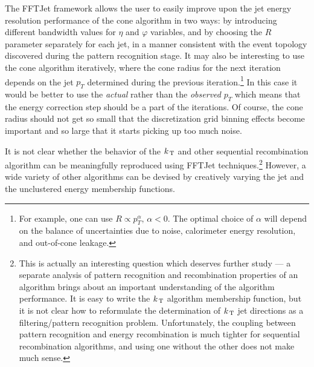 \documentclass[epsf,12pt,titlepage]{article}
\newcommand{\sub}[1]{\ensuremath{_{\mbox{\scriptsize \,#1}}}}
\def\KT {\mbox{$k\sub{T}$} }
\begin{document}
The FFTJet framework allows the user to easily improve
upon the jet energy resolution performance of the cone algorithm
in two ways: by introducing different bandwidth
values for $\eta$ and $\varphi$ variables, and by
choosing the $R$ parameter separately for each jet,
in a manner consistent with the event topology discovered
during the pattern recognition stage. It may also
be interesting to use the cone algorithm iteratively, where the
cone radius for the next iteration depends on the jet $p_T$
determined during the previous iteration.\footnote{For example,
one can use $R \propto p_T^{\alpha}, \, \alpha < 0$. The optimal
choice of $\alpha$ will depend on the balance of uncertainties
due to noise, calorimeter energy resolution, and out-of-cone leakage.}
In this case it would be better to use
the {\it actual} rather than the {\it observed} $p_T$
which means that the energy correction step should be a part of the iterations.
Of course, the cone radius should not get so small that the
discretization grid binning effects become important and so large
that it starts picking up too much noise.

It is not clear whether the behavior of the \KT and other
sequential recombination algorithm can be
meaningfully reproduced using FFTJet techniques.\footnote{This is
actually an interesting question which deserves further study --- a separate
analysis of pattern recognition and recombination properties of an algorithm
brings about an important understanding of the algorithm performance.
It is easy to write the \KT algorithm membership function, but it
is not clear how to reformulate the determination of \KT jet directions
as a filtering/pattern recognition problem. Unfortunately, the coupling between
pattern recognition and energy recombination
is much tighter for sequential recombination algorithms,
and using one without the other does not make much sense.}
However,
a wide variety of other algorithms can be devised by 
creatively varying the jet and the unclustered energy membership functions.

\end{document}
